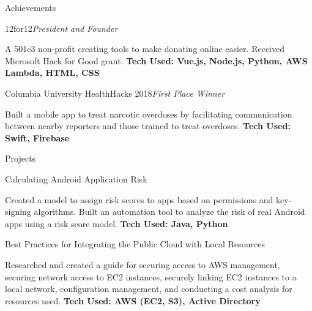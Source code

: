 \documentclass{resume}
\begin{document}

\begin{rSection}{Achievements} 

\begin{rSubsection}{12for12}{}{\em \it President and Founder}{}
\item A 501c3 non-profit creating tools to make donating online easier. Received Microsoft Hack for Good grant. {\bf Tech Used: Vue.js, Node.js, Python, AWS Lambda, HTML, CSS}
\end{rSubsection}
\begin{rSubsection}{Columbia University HealthHacks 2018}{}{\em \it First Place Winner}{}
\item Built a mobile app to treat narcotic overdoses by facilitating communication between nearby reporters and those trained to treat overdoses. {\bf Tech Used: Swift, Firebase}
\end{rSubsection}

\end{rSection}

\begin{rSection}{Projects}

\begin{rSubsection}{Calculating Android Application Risk}{}{}{}
\item Created a model to assign risk scores to apps based on permissions and key-signing algorithms. Built an automation tool to analyze the risk of real Android apps using a risk score model. 
{\bf Tech Used: Java, Python}
\end{rSubsection}

\begin{rSubsection}{Best Practices for Integrating the Public Cloud with Local Resources}{}{}{}
\item Researched and created a guide for securing access to AWS management, securing network access to EC2 instances, securely linking EC2 instances to a local network, configuration management, and conducting a cost analysis for resources used.  
{\bf Tech Used: AWS (EC2, S3), Active Directory}
\end{rSubsection}

\end{rSection}
\end{document}
